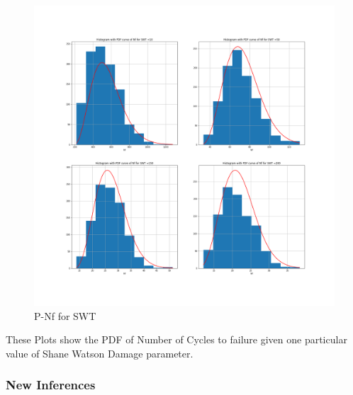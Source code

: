 \documentclass[11pt]{article}
\begin{document}
\begin{figure}
\centering
\includegraphics{images/nfswtpdf.png}
\caption{P-Nf for SWT}
\end{figure}

These Plots show the PDF of Number of Cycles to failure given one
particular value of Shane Watson Damage parameter.

\hypertarget{new-inferences}{%
\subsubsection{New Inferences}\label{new-inferences}}
\end{document}
